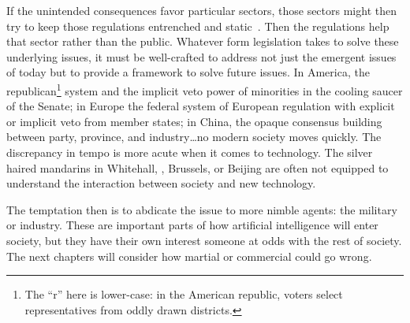If the unintended consequences favor particular sectors, those sectors
might then try to keep those regulations entrenched and static~\citep{croley-08}.  Then
the regulations help that sector rather than the public.
%
Whatever form legislation takes to solve these underlying issues, it
must be well-crafted to address not just the emergent issues of today
but to provide a framework to solve future issues.
%
In America, the republican\footnote{The ``r'' here is lower-case: in the
  American republic, voters select representatives from oddly drawn
  districts.} system and the implicit veto power of minorities in the
cooling saucer of the Senate; in Europe the federal system of European
regulation with explicit or implicit veto from member states; in
China, the opaque consensus building between party, province, and
industry\dots no modern society moves quickly.
%
The discrepancy in tempo is more acute when it comes to technology.
%
The silver haired mandarins in Whitehall, , Brussels, or Beijing
are often not equipped to understand the interaction between society
and new technology.


The temptation then is to abdicate the issue to more nimble agents:
the military or industry.
%
These are important parts of how artificial intelligence will enter
society, but they have their own interest someone at odds with the
rest of society.
%
The next chapters will consider how martial or commercial 
could go wrong.


